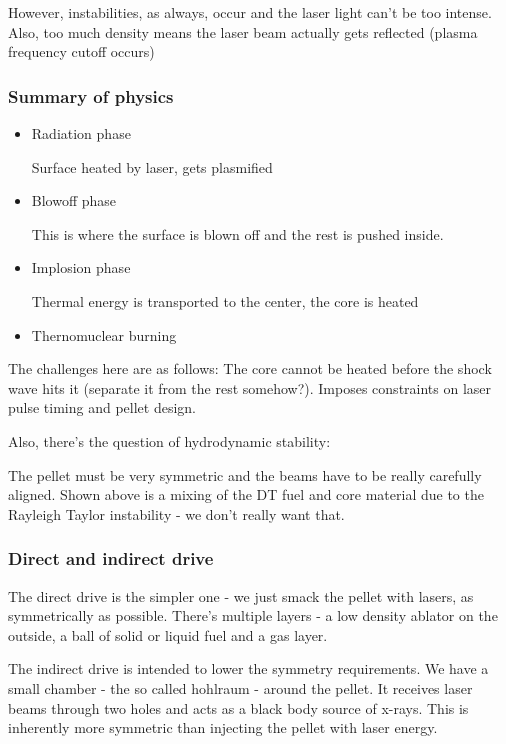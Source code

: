\documentclass[PlasmaNotes.tex]{subfiles}
\begin{document}
However, instabilities, as always, occur and the laser light can't be too intense. Also, too much density means the laser beam actually gets reflected (plasma frequency cutoff occurs)

\subsubsection{Summary of physics}

\begin{itemize}
 \item Radiation phase
 
 Surface heated by laser, gets plasmified
 \item Blowoff phase
 
 This is where the surface is blown off and the rest is pushed inside.
 
 \item Implosion phase
 
 Thermal energy is transported to the center, the core is heated
 
 \item Thernomuclear burning
 
\end{itemize}

The challenges here are as follows: The core cannot be heated before the shock wave hits it (separate it from the rest somehow?). Imposes constraints on laser pulse timing and pellet design.

Also, there's the question of hydrodynamic stability:


The pellet must be very symmetric and the beams have to be really carefully aligned. Shown above is a mixing of the DT fuel and core material due to the Rayleigh Taylor instability - we don't really want that.

\subsubsection{Direct and indirect drive}

The direct drive is the simpler one - we just smack the pellet with lasers, as symmetrically as possible. There's multiple layers - a low density ablator on the outside, a ball of solid or liquid fuel and a gas layer.

The indirect drive is intended to lower the symmetry requirements. We have a small chamber - the so called hohlraum - around the pellet. It receives laser beams through two holes and acts as a black body source of x-rays. This is inherently more symmetric than injecting the pellet with laser energy.
\end{document}

